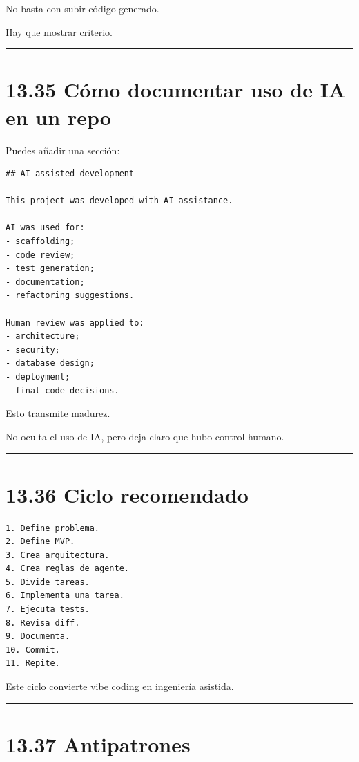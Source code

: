 No basta con subir código generado.

Hay que mostrar criterio.

\begin{center}\rule{0.5\linewidth}{0.5pt}\end{center}

\section{13.35 Cómo documentar uso de IA en un
repo}\label{cuxf3mo-documentar-uso-de-ia-en-un-repo}

Puedes añadir una sección:

\begin{lstlisting}
## AI-assisted development

This project was developed with AI assistance.

AI was used for:
- scaffolding;
- code review;
- test generation;
- documentation;
- refactoring suggestions.

Human review was applied to:
- architecture;
- security;
- database design;
- deployment;
- final code decisions.
\end{lstlisting}

Esto transmite madurez.

No oculta el uso de IA, pero deja claro que hubo control humano.

\begin{center}\rule{0.5\linewidth}{0.5pt}\end{center}

\section{13.36 Ciclo recomendado}\label{ciclo-recomendado}

\begin{lstlisting}
1. Define problema.
2. Define MVP.
3. Crea arquitectura.
4. Crea reglas de agente.
5. Divide tareas.
6. Implementa una tarea.
7. Ejecuta tests.
8. Revisa diff.
9. Documenta.
10. Commit.
11. Repite.
\end{lstlisting}

Este ciclo convierte vibe coding en ingeniería asistida.

\begin{center}\rule{0.5\linewidth}{0.5pt}\end{center}

\section{13.37 Antipatrones}\label{antipatrones-2}

